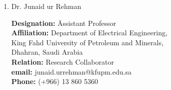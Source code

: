 \documentclass[10pt]{article}
\begin{document}
\begin{enumerate}
 	\item[4.] Dr. Junaid ur Rehman\\[-0.8cm]
	\begin{tabbing}
		\textbf{Designation:} \= Assistant Professor\\
		\textbf{Affiliation:} \> Department of Electrical Engineering, \\
		\> King Fahd University of Petroleum and Minerals,\\
              \>  Dhahran, Saudi Arabia\\
		\textbf{Relation:} \> Research Collaborator\\
		\textbf{email:} \> junaid.urrehman@kfupm.edu.sa\\
		\textbf{Phone:} \> (+966) 13 860 5360
	\end{tabbing}

\end{enumerate}
\end{document}
